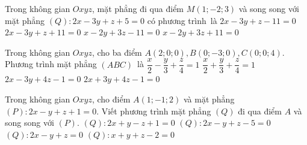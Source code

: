 \begin{ex}%
	Trong không gian  $Oxyz$, mặt phẳng đi qua điểm $M(1;-2;3)$ và song song với mặt phẳng $(Q) \colon 2x-3y+z+5=0$ có phương trình~là
	 \choice
		{$2x-3y+z-11=0$} 
		{\True $2x-3y+z+11=0$} 
		 {$x-2y+3z-11=0$}
		 {$x-2y+3z+11=0$}
\end{ex}

\begin{ex}%
	Trong không gian $Oxyz$,  cho ba điểm $A(2;0;0), B(0;-3;0), C(0;0;4)$. Phương trình mặt phẳng $(ABC)$~là
	 \choice
		{\True  $\dfrac{x}{2}-\dfrac{y}{3}+\dfrac{z}{4}=1$}
		{$\dfrac{x}{2}+\dfrac{y}{3}+\dfrac{z}{4}=1$} 
		 {$2x-3y+4z-1=0$}
		 {$2x+3y+4z-1=0$}
\end{ex}

\begin{ex}%
	Trong không gian $Oxyz$, cho điểm $A(1;-1;2)$ và mặt phẳng $(P)\colon 2x-y+z+1=0$. Viết phương trình mặt phẳng $(Q)$  đi qua điểm $A$ và song song với $(P)$.
	\choice 
		{$(Q)\colon 2x+y-z+1=0$} 
		{\True $(Q)\colon  2x-y+z-5=0$}
		 {$(Q)\colon 2x-y+z=0$}
		{$(Q)\colon  x+y+z-2=0$}
\end{ex}

